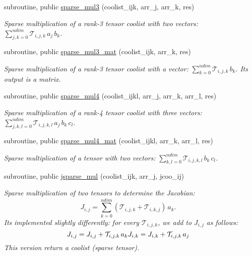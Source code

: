 \begin{DoxyCompactItemize}
subroutine, public \hyperlink{namespacetensor_a11054027a386918658f8948231af53b1}{sparse\+\_\+mul3} (coolist\+\_\+ijk, arr\+\_\+j, arr\+\_\+k, res)
\begin{DoxyCompactList}\small\item\em Sparse multiplication of a rank-\/3 tensor coolist with two vectors\+: ${\displaystyle \sum_{j,k=0}^{ndim}} \mathcal{T}_{i,j,k} \, a_j \,b_k$. \end{DoxyCompactList}\item 
subroutine, public \hyperlink{namespacetensor_a08965e1040a94fc58c1efa9ff9639118}{sparse\+\_\+mul3\+\_\+mat} (coolist\+\_\+ijk, arr\+\_\+k, res)
\begin{DoxyCompactList}\small\item\em Sparse multiplication of a rank-\/3 tensor coolist with a vector\+: ${\displaystyle \sum_{k=0}^{ndim}} \mathcal{T}_{i,j,k} \, b_k$. Its output is a matrix. \end{DoxyCompactList}\item 
subroutine, public \hyperlink{namespacetensor_ab365e6dbb17e7fb26fef90649dd9e445}{sparse\+\_\+mul4} (coolist\+\_\+ijkl, arr\+\_\+j, arr\+\_\+k, arr\+\_\+l, res)
\begin{DoxyCompactList}\small\item\em Sparse multiplication of a rank-\/4 tensor coolist with three vectors\+: ${\displaystyle \sum_{j,k,l=0}^{ndim}} \mathcal{T}_{i,j,k,l} \, a_j \,b_k \, c_l $. \end{DoxyCompactList}\item 
subroutine, public \hyperlink{namespacetensor_a2fda12a024f8e3d0d6a167f264f6d000}{sparse\+\_\+mul4\+\_\+mat} (coolist\+\_\+ijkl, arr\+\_\+k, arr\+\_\+l, res)
\begin{DoxyCompactList}\small\item\em Sparse multiplication of a tensor with two vectors\+: ${\displaystyle \sum_{k,l=0}^{ndim}} \mathcal{T}_{i,j,k,l} \,b_k \, c_l $. \end{DoxyCompactList}\item 
subroutine, public \hyperlink{namespacetensor_add2a6aa993cd8a23be60d1643b5c7942}{jsparse\+\_\+mul} (coolist\+\_\+ijk, arr\+\_\+j, jcoo\+\_\+ij)
\begin{DoxyCompactList}\small\item\em Sparse multiplication of two tensors to determine the Jacobian\+: \[J_{i,j} = {\displaystyle \sum_{k=0}^{ndim}} \left( \mathcal{T}_{i,j,k} + \mathcal{T}_{i,k,j} \right) \, a_k.\] It\textquotesingle{}s implemented slightly differently\+: for every $\mathcal{T}_{i,j,k}$, we add to $J_{i,j}$ as follows\+: \[J_{i,j} = J_{i,j} + \mathcal{T}_{i,j,k} \, a_k \\ J_{i,k} = J_{i,k} + \mathcal{T}_{i,j,k} \, a_j\] This version return a coolist (sparse tensor). \end{DoxyCompactList}\item 

\end{DoxyCompactItemize}
